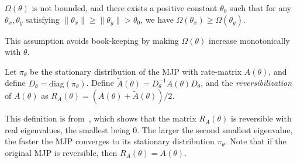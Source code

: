 \begin{assumption}
  $\Omega(\theta)$ is not bounded, and there exists a positive constant $\theta_0$ such 
  that for any $\theta_x, \theta_y$ satisfying
  $\| \theta_x \| \ge \| \theta_y \| > \theta_0$, we have $\Omega(\theta_x) \ge \Omega(\theta_y)$.  
  \label{asmp:mono_tail}
\end{assumption}
\noindent %
This assumption avoids book-keeping by making 
$\Omega(\theta)$ increase monotonically with $\theta$.

\begin{definition}
Let $\pi_\theta$ be the stationary distribution of the MJP with rate-matrix 
$A(\theta)$, and define $D_\theta = \text{diag}(\pi_\theta)$. Define 
$\tilde{A}(\theta) = D_\theta^{-1}A(\theta)D_\theta$, and the 
{\em reversibilization} of $A(\theta)$ as $R_A(\theta) = 
(A(\theta)+\tilde{A}(\theta))/2$. 
\label{def:mjp_symm}
\end{definition}
This definition is from~\cite{fill1991}, which shows that the matrix 
$R_A(\theta)$ is reversible with real eigenvalues, the smallest being $0$. 
The larger the second smallest eigenvalue, the faster the MJP converges to its 
stationary distribution $\pi_\theta$.
Note that if the original MJP is reversible, then $R_A(\theta) = A(\theta)$.


